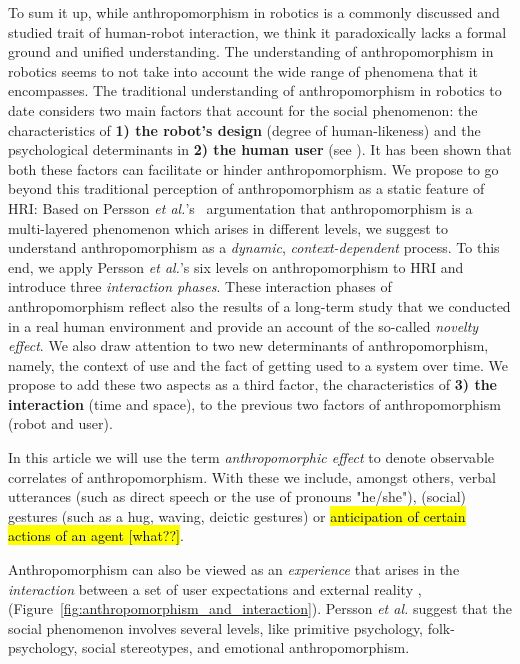 \documentclass{frontiersSCNS} %
\begin{document}
To sum it up, while anthropomorphism in robotics is a commonly discussed and
studied trait of human-robot interaction, we think it paradoxically lacks a
formal ground and unified understanding. The understanding of anthropomorphism
in robotics seems to not take into account the wide range of phenomena that it
encompasses. The traditional understanding of anthropomorphism in robotics to
date considers two main factors that account for the social phenomenon: the
characteristics of \textbf{1) the robot's design} (degree of human-likeness) and
the psychological determinants in \textbf{2) the human user} (see
\cite{epley_seeing_2007}). It has been shown that both these factors can
facilitate or hinder anthropomorphism. We propose to go beyond this traditional
perception of anthropomorphism as a static feature of HRI: Based on Persson
\textit{et al.}'s~\cite{persson_anthropomorphism_2000} argumentation that
anthropomorphism is a multi-layered phenomenon which arises in different levels,
we suggest to understand anthropomorphism as a \emph{dynamic},
\emph{context-dependent} process. To this end, we apply Persson \textit{et
al.}'s six levels on anthropomorphism to HRI and introduce three
\emph{interaction phases}. These interaction phases of anthropomorphism reflect
also the results of a long-term study that we conducted in a real human
environment and provide an account of the so-called \textit{novelty effect}. We
also draw attention to two new determinants of anthropomorphism, namely, the
context of use and the fact of getting used to a system over time. We propose to
add these two aspects as a third factor, the characteristics of \textbf{3) the
interaction} (time and space), to the previous two factors of anthropomorphism
(robot and user). 

In this article we will use the term \emph{anthropomorphic effect} to denote
observable correlates of anthropomorphism. With these we include, amongst
others, verbal utterances (such as direct speech or the use of pronouns
"he/she"), (social) gestures (such as a hug, waving, deictic gestures) or
\hl{anticipation of certain actions of an agent [what??]}.

Anthropomorphism can also be viewed as an \textit{experience} that arises in the
\textit{interaction} between a set of user expectations and external reality
\cite{persson_anthropomorphism_2000},
(Figure~\ref{fig:anthropomorphism_and_interaction}). Persson \textit{et al.}
suggest that the social phenomenon involves several levels, like primitive
psychology, folk-psychology, social stereotypes, and emotional anthropomorphism. 
\end{document}
